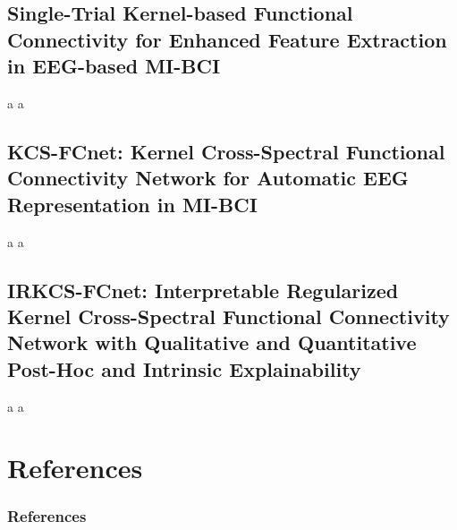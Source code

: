 \documentclass[aspectratio=169]{beamer}
\let\oldcite\cite %
\renewcommand{\cite}[1]{{\tiny\oldcite{#1}}}
\begin{document}
\subsection{Single-Trial Kernel-based Functional Connectivity for Enhanced Feature Extraction in EEG-based MI-BCI}

\begin{frame}{a}
    a
\end{frame}

\subsection{KCS-FCnet: Kernel Cross-Spectral Functional Connectivity Network for Automatic EEG Representation in MI-BCI}

\begin{frame}{a}
    a
\end{frame}

\subsection{IRKCS-FCnet: Interpretable Regularized Kernel Cross-Spectral Functional Connectivity Network with Qualitative and Quantitative Post-Hoc and Intrinsic Explainability}

\begin{frame}{a}
    a
\end{frame}


\section{References}
\begin{frame}[allowframebreaks]%
\frametitle{References}
{\tiny 


}
\end{frame}
\end{document}
